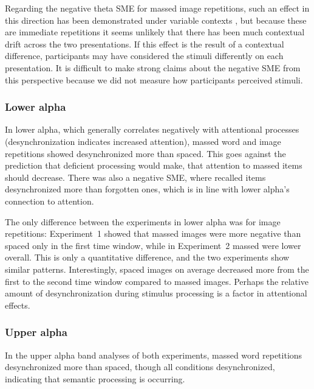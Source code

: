 
Regarding the negative theta SME for massed image repetitions, such an effect in this direction has been demonstrated under variable contexts \cite{StauHans2013}, but because these are immediate repetitions it seems unlikely that there has been much contextual drift across the two presentations.  If this effect is the result of a contextual difference, participants may have considered the stimuli differently on each presentation.  It is difficult to make strong claims about the negative SME from this perspective because we did not measure how participants perceived stimuli.

\subsubsection{Lower alpha}

In lower alpha, which generally correlates negatively with attentional processes (desynchronization indicates increased attention), massed word and image repetitions showed desynchronized more than spaced.  This goes against the prediction that deficient processing would make, that attention to massed items should decrease.  There was also a negative SME, where recalled items desynchronized more than forgotten ones, which is in line with lower alpha's connection to attention.

The only difference between the experiments in lower alpha was for image repetitions: Experiment~1 showed that massed images were more negative than spaced only in the first time window, while in Experiment~2 massed were lower overall.  This is only a quantitative difference, and the two experiments show similar patterns.  Interestingly, spaced images on average decreased more from the first to the second time window compared to massed images.  Perhaps the relative amount of desynchronization during stimulus processing is a factor in attentional effects.

\subsubsection{Upper alpha}

In the upper alpha band analyses of both experiments, massed word repetitions desynchronized more than spaced, though all conditions desynchronized, indicating that semantic processing is occurring.

